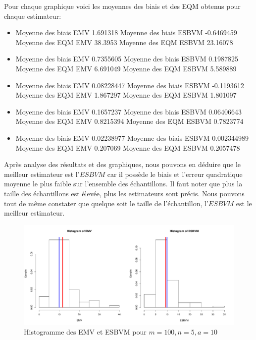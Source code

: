 \documentclass[12pt]{article}
\begin{document}
\begin{enumerate}
Pour chaque graphique voici les moyennes des biais et des EQM obtenus pour chaque estimateur:
\begin{itemize}
\item Moyenne des biais EMV 1.691318 
Moyenne des biais ESBVM -0.6469459 
Moyenne des EQM EMV 38.3953 
Moyenne des EQM ESBVM 23.16078 
\item Moyenne des biais EMV 0.7355605 
Moyenne des biais ESBVM 0.1987825 
Moyenne des EQM EMV 6.691049 
Moyenne des EQM ESBVM 5.589889 
\item Moyenne des biais EMV 0.08228447 
Moyenne des biais ESBVM -0.1193612 
Moyenne des EQM EMV 1.867297 
Moyenne des EQM ESBVM 1.801097 
\item Moyenne des biais EMV 0.1657237 
Moyenne des biais ESBVM 0.06406643 
Moyenne des EQM EMV 0.8215394 
Moyenne des EQM ESBVM 0.7823774 
\item Moyenne des biais EMV 0.02238977 
Moyenne des biais ESBVM 0.002344989 
Moyenne des EQM EMV 0.207069 
Moyenne des EQM ESBVM 0.2057478 
\\
\end{itemize}


Apr\`{e}s analyse des r\'{e}sultats et des graphiques, nous pouvons en d\'{e}duire que le meilleur estimateur est l'$ESBVM$ car il poss\`{e}de  le biais et l'erreur quadratique moyenne le plus faible sur l'ensemble des \'{e}chantillons. Il faut noter que plus la taille des \'{e}chantillons est \'{e}lev\'{e}e, plus les estimateurs sont pr\'{e}cis. Nous pouvons tout de m\^{e}me constater que quelque soit le taille de l'\'{e}chantillon, l'$ESBVM$ est le meilleur estimateur.
\\
\begin{figure}[ht]
\centering
\includegraphics[width=1.0\textwidth]{figures/GraphP2Q31.pdf}
\caption{Histogramme des EMV et ESBVM pour $m=100, n=5, a=10$}
\end{figure}


\end{enumerate}
\end{document}
